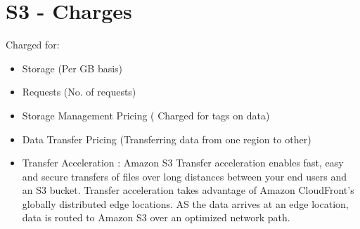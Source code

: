 \documentclass{article}
\begin{document}
\section{S3 - Charges}
Charged for:
\begin{itemize}
\item
Storage (Per GB basis)

\item
Requests (No. of requests)

\item
Storage Management Pricing ( Charged for tags on data)

\item
Data Transfer Pricing (Transferring data from one region to other)

\item
Transfer Acceleration : Amazon S3 Transfer acceleration enables fast, easy and secure transfers of files over long distances between your end users and an S3 bucket. Transfer acceleration takes advantage of Amazon CloudFront's globally distributed edge locations. AS the data arrives at an edge location, data is routed to Amazon S3 over an optimized network path.
\end{itemize}
\end{document}

